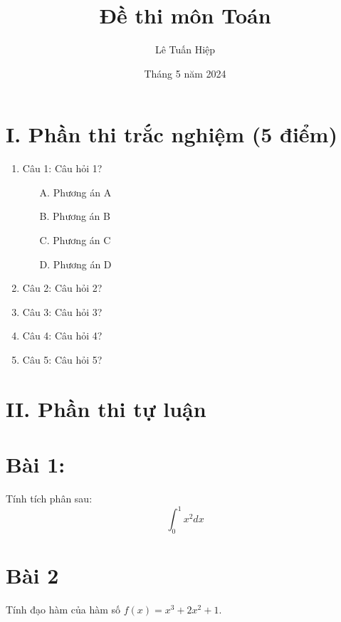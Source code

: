\documentclass{article}
\begin{document}
\title{Đề thi môn Toán}
\author{Lê Tuấn Hiệp}
\date{Tháng 5 năm 2024}
\maketitle

\section*{I. Phần thi trắc nghiệm (5 điểm)}

\begin{enumerate}
  \item Câu 1: Câu hỏi 1?
    \begin{enumerate}
      \item[A.] Phương án A
      \item[B.] Phương án B
      \item[C.] Phương án C
      \item[D.] Phương án D
    \end{enumerate}
  \item Câu 2: Câu hỏi 2?
  \item Câu 3: Câu hỏi 3?
  \item Câu 4: Câu hỏi 4?
  \item Câu 5: Câu hỏi 5?
\end{enumerate}

\section*{II. Phần thi tự luận}

\section*{Bài 1:}
Tính tích phân sau:
\[
\int_{0}^{1} x^2 dx
\]

\section*{Bài 2}
Tính đạo hàm của hàm số $f(x) = x^3 + 2x^2 + 1$.
\end{document}
